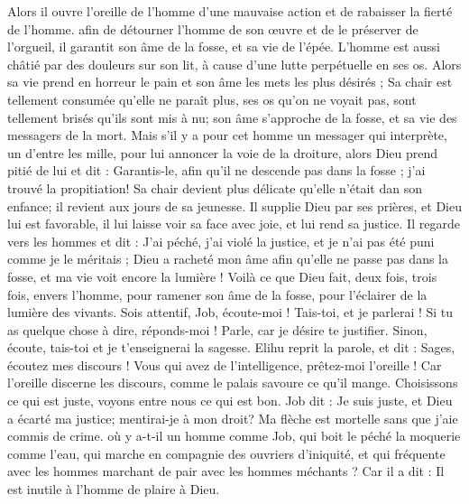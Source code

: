 \begin{multicols}{2}
{Alors il ouvre l'oreille de l'homme d'une mauvaise action et de rabaisser la fierté de l'homme.
afin de détourner l'homme de son œuvre et de le préserver de l'orgueil,
il garantit son âme de la fosse, et sa vie de l'épée.
L'homme est aussi châtié par des douleurs sur son lit, à cause d'une lutte perpétuelle en ses os.
Alors sa vie prend en horreur le pain et son âme les mets les plus désirés ;
Sa chair est tellement consumée qu'elle ne paraît plus, ses os qu'on ne voyait pas, sont tellement brisés qu'ils sont mis à nu;
son âme s'approche de la fosse, et sa vie des messagers de la mort.
Mais s'il y a pour cet homme un messager qui interprète, un d'entre les mille, pour lui annoncer la voie de la droiture,
alors Dieu prend pitié de lui et dit : Garantis-le, afin qu'il ne descende pas dans la fosse ; j'ai trouvé la propitiation!
Sa chair devient plus délicate qu'elle n'était dan son enfance; il revient aux jours de sa jeunesse.
Il supplie Dieu par ses prières, et Dieu lui est favorable, il lui laisse voir sa face avec joie, et lui rend sa justice.
Il regarde vers les hommes et dit : J'ai péché, j'ai violé la justice, et je n'ai pas été puni comme je le méritais ;
Dieu a racheté mon âme afin qu'elle ne passe pas dans la fosse, et ma vie voit encore la lumière !
Voilà ce que Dieu fait, deux fois, trois fois, envers l'homme,
pour ramener son âme de la fosse, pour l'éclairer de la lumière des vivants.
Sois attentif, Job, écoute-moi ! Tais-toi, et je parlerai !
Si tu as quelque chose à dire, réponds-moi ! Parle, car je désire te justifier.
Sinon, écoute, tais-toi et je t'enseignerai la sagesse.
\VerseOne{}Elihu reprit la parole, et dit :
Sages, écoutez mes discours ! Vous qui avez de l'intelligence, prêtez-moi l'oreille !
Car l'oreille discerne les discours, comme le palais savoure ce qu'il mange.
Choisissons ce qui est juste, voyons entre nous ce qui est bon.
Job dit : Je suis juste, et Dieu a écarté ma justice;
mentirai-je à mon droit? Ma flèche est mortelle sans que j'aie commis de crime.
où y a-t-il un homme comme Job, qui boit le péché la moquerie comme l'eau,
qui marche en compagnie des ouvriers d'iniquité, et qui fréquente  avec les hommes marchant de pair avec les hommes méchants ?
Car il a dit : Il est inutile à l'homme de plaire à Dieu.
}
\end{multicols}
